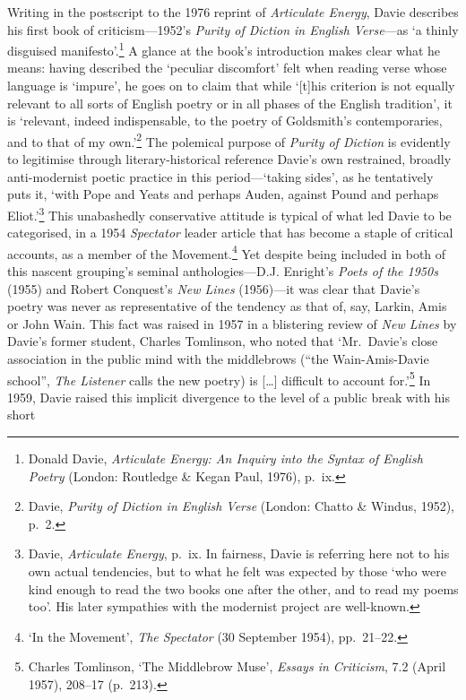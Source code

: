 \documentclass[]{article}
\begin{document}
Writing in the postscript to the 1976 reprint of \emph{Articulate
Energy}, Davie describes his first book of criticism—1952’s \emph{Purity
of Diction in English Verse}—as ‘a thinly disguised
manifesto’.\footnote{Donald Davie, \emph{Articulate Energy: An Inquiry
  into the Syntax of English Poetry} (London: Routledge \& Kegan Paul,
  1976), p.~ix.} A glance at the book’s introduction makes clear what he
means: having described the ‘peculiar discomfort’ felt when reading
verse whose language is ‘impure’, he goes on to claim that while
‘{[}t{]}his criterion is not equally relevant to all sorts of English
poetry or in all phases of the English tradition’, it is ‘relevant,
indeed indispensable, to the poetry of Goldsmith’s contemporaries, and
to that of my own.’\footnote{Davie, \emph{Purity of Diction in English
  Verse} (London: Chatto \& Windus, 1952), p.~2.} The polemical purpose
of \emph{Purity of Diction} is evidently to legitimise through
literary-historical reference Davie’s own restrained, broadly
anti-modernist poetic practice in this period—‘taking sides’, as he
tentatively puts it, ‘with Pope and Yeats and perhaps Auden, against
Pound and perhaps Eliot.’\footnote{Davie, \emph{Articulate Energy},
  p.~ix. In fairness, Davie is referring here not to his own actual
  tendencies, but to what he felt was expected by those ‘who were kind
  enough to read the two books one after the other, and to read my poems
  too’. His later sympathies with the modernist project are well-known.}
This unabashedly conservative attitude is typical of what led Davie to
be categorised, in a 1954 \emph{Spectator} leader article that has
become a staple of critical accounts, as a member of the
Movement.\footnote{‘In the Movement’, \emph{The Spectator} (30 September
  1954), pp.~21–22.} Yet despite being included in both of this nascent
grouping’s seminal anthologies—D.J. Enright’s \emph{Poets of the 1950s}
(1955) and Robert Conquest’s \emph{New Lines} (1956)—it was clear that
Davie’s poetry was never as representative of the tendency as that of,
say, Larkin, Amis or John Wain. This fact was raised in 1957 in a
blistering review of \emph{New Lines} by Davie’s former student, Charles
Tomlinson, who noted that ‘Mr.~Davie’s close association in the public
mind with the middlebrows (“the Wain-Amis-Davie school”, \emph{The
Listener} calls the new poetry) is {[}\ldots{}{]} difficult to account
for.’\footnote{Charles Tomlinson, ‘The Middlebrow Muse’, \emph{Essays in
  Criticism}, 7.2 (April 1957), 208–17 (p.~213).} In 1959, Davie raised
this implicit divergence to the level of a public break with his short
\end{document}

